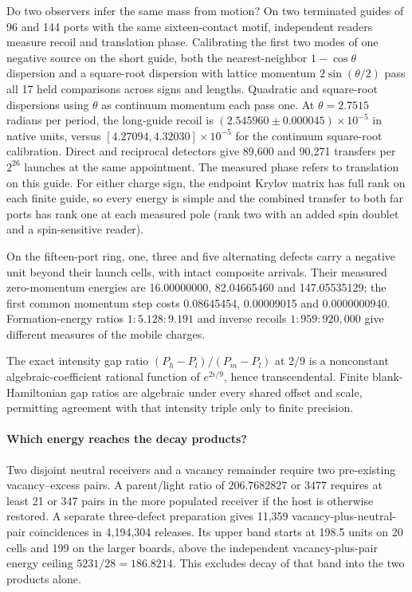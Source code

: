 Do two observers infer the same mass from motion? On two terminated
guides of 96 and 144 ports with the same sixteen-contact motif,
independent readers measure recoil and translation phase. Calibrating the first two modes
of one negative source on the short guide, both the nearest-neighbor
$1-\cos\theta$ dispersion and a square-root dispersion with lattice
momentum $2\sin(\theta/2)$ pass all 17 held comparisons across signs
and lengths. Quadratic and square-root dispersions using $\theta$ as
continuum momentum each pass one. At $\theta=2.7515$ radians per period, the long-guide recoil
is $(2.545960\pm0.000045)\times10^{-5}$ in native units, versus
$[4.27094,4.32030]\times10^{-5}$ for the continuum square-root calibration.
Direct and reciprocal detectors give 89,600 and 90,271 transfers
per $2^{26}$ launches at the same appointment. The measured phase
refers to translation on this guide. For either charge sign, the
endpoint Krylov matrix has full rank on each finite guide, so every
energy is simple and the combined transfer to both far ports has
rank one at each measured pole (rank two with an added spin doublet
and a spin-sensitive reader).

On the fifteen-port ring, one, three and five alternating defects carry
a negative unit beyond their launch cells, with intact composite
arrivals. Their measured zero-momentum energies are 16.00000000,
82.04665460 and 147.05535129; the first common momentum step costs
0.08645454, 0.00009015 and 0.0000000940. Formation-energy ratios
$1:5.128:9.191$ and inverse recoils $1:959:920{,}000$ give
different measures of the mobile charges.

The exact intensity gap ratio $(P_h-P_l)/(P_m-P_l)$ at $2/9$ is a
nonconstant algebraic-coefficient rational function of $e^{2i/9}$,
hence transcendental. Finite blank-Hamiltonian gap ratios are
algebraic under every shared offset and scale, permitting agreement
with that intensity triple only to finite precision.

\paragraph{Which energy reaches the decay products?}
Two disjoint neutral receivers and a vacancy remainder require two
pre-existing vacancy--excess pairs. A parent/light ratio of $206.7682827$
or $3477$ requires at least 21 or 347 pairs in the more populated
receiver if the host is otherwise restored. A separate three-defect
preparation gives 11,359 vacancy-plus-neutral-pair coincidences in
4,194,304 releases. Its upper band starts at 198.5 units on 20 cells
and 199 on the larger boards, above the independent vacancy-plus-pair
energy ceiling $5231/28=186.8214$. This excludes decay of that band
into the two products alone.

